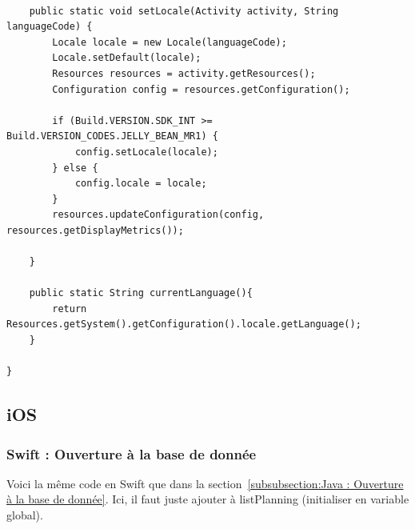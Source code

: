 \documentclass{article}
\begin{document}
\begin{verbatim}
   
    public static void setLocale(Activity activity, String languageCode) {
        Locale locale = new Locale(languageCode);
        Locale.setDefault(locale);
        Resources resources = activity.getResources();
        Configuration config = resources.getConfiguration();
        
        if (Build.VERSION.SDK_INT >= Build.VERSION_CODES.JELLY_BEAN_MR1) {
            config.setLocale(locale);
        } else {
            config.locale = locale;
        }
        resources.updateConfiguration(config, resources.getDisplayMetrics());

    }

    public static String currentLanguage(){
        return Resources.getSystem().getConfiguration().locale.getLanguage();
    }

}\end{verbatim}



\subsection{iOS} %
\label{subsection:iOS} 


\subsubsection{Swift : Ouverture à la base de donnée}
\label{subsubsection:Swift : Ouverture à la base de donnée} 
Voici la même code en Swift que dans la section~\ref{subsubsection:Java : Ouverture à la base de donnée}.
Ici, il faut juste ajouter à listPlanning (initialiser en variable global).
\end{document}
